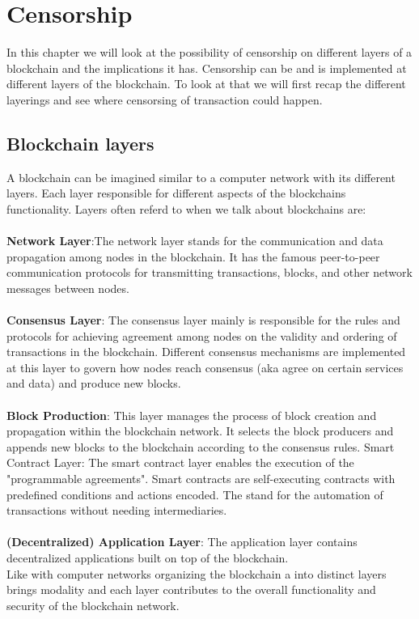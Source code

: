 \documentclass{article}
\begin{document}
\section{Censorship}

In this chapter we will look at the possibility of censorship on different layers of a blockchain and the implications it has. Censorship can be and is implemented at different layers of the blockchain. To look at that we will first recap the different layerings and see where censorsing of transaction could happen.
\subsection{Blockchain layers}
A blockchain can be imagined similar to a computer network with its different layers. Each layer responsible for different aspects of the blockchains functionality. Layers often referd to when we talk about blockchains are:\\
\\
\textbf{Network Layer}:The network layer stands for the communication and data propagation among nodes in the blockchain. It has the famous peer-to-peer communication protocols for transmitting transactions, blocks, and other network messages between nodes.\\
\\
\textbf{Consensus Layer}: The consensus layer mainly is responsible for the rules and protocols for achieving agreement among nodes on the validity and ordering of transactions in the blockchain. Different consensus mechanisms are implemented at this layer to govern how nodes reach consensus (aka agree on certain services and data) and produce new blocks.\\
\\
\textbf{Block Production}: This layer manages the process of block creation and propagation within the blockchain network. It selects the block producers and appends new blocks to the blockchain according to the consensus rules.
Smart Contract Layer: The smart contract layer enables the execution of the "programmable agreements". Smart contracts are self-executing contracts with predefined conditions and actions encoded. The stand for the automation of transactions without needing intermediaries.\\
\\
\textbf{(Decentralized) Application Layer}: The application layer contains decentralized applications built on top of the blockchain.
\\
Like with computer networks organizing the blockchain a into distinct layers brings modality and each layer contributes to the overall functionality and security of the blockchain network.
\end{document}

